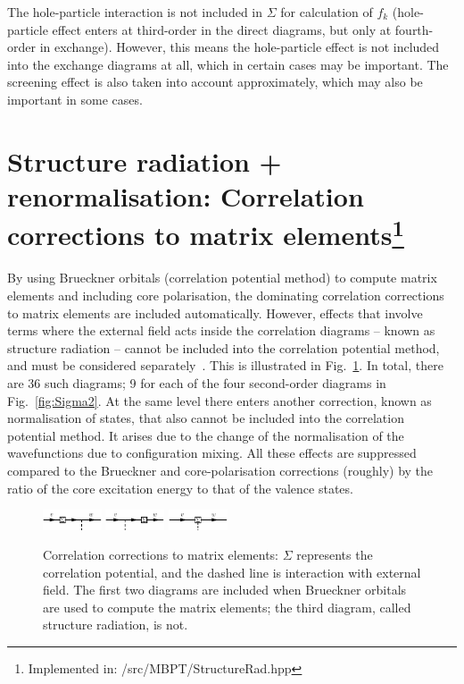 \documentclass[10pt,twocolumn,a4paper]{article}%
\begin{document}
The hole-particle interaction is not included in $\Sigma$ for calculation of $f_k$
(hole-particle effect enters at third-order in the direct diagrams, but only at fourth-order in exchange).
However, this means the hole-particle effect is not included into the exchange diagrams at all, which in certain cases may be important.
The screening effect is also taken into account approximately, which may also be important in some cases.










\section[Structure radiation + renormalisation]{Structure radiation + renormalisation: Correlation corrections to matrix elements\footnote{Implemented in: /src/MBPT/StructureRad.hpp}}

By using Brueckner orbitals (correlation potential method) to compute matrix elements and including core polarisation, the dominating correlation corrections to matrix elements are included automatically.
However, effects that involve terms where the external field acts {\rm inside} the correlation diagrams -- known as structure radiation -- cannot be included into the correlation potential method, and must be considered separately~\cite{Blundell1987,Dzuba1987jpbRPA}.
This is illustrated in Fig.~\ref{fig:SR1}.
In total, there are 36 such diagrams; 9 for each of the four second-order diagrams in Fig.~\ref{fig:Sigma2}.
At the same level there enters another correction, known as normalisation of states, that also cannot be included into the correlation potential method. 
It arises due to the change of the normalisation of the wavefunctions due to configuration mixing.
All these effects are suppressed compared to the Brueckner and core-polarisation corrections (roughly) by the ratio of the core excitation energy to that of the valence states.

\begin{figure}%
\centering
\includegraphics[width=0.155\textwidth]{img/sr/BOv}
\includegraphics[width=0.155\textwidth]{img/sr/BOw}
\includegraphics[width=0.155\textwidth]{img/sr/SR}
\caption{\label{fig:SR1}\small Correlation corrections to matrix elements: $\Sigma$ represents the correlation potential, and the dashed line is interaction with external field. The first two diagrams are included when Brueckner orbitals are used to compute the matrix elements; the third diagram, called structure radiation, is not.}
\end{figure}
\end{document}
